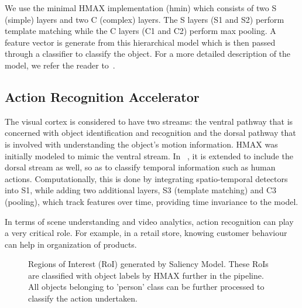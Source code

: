 We use the minimal HMAX implementation (hmin) which consists of two S (simple) layers and two C (complex) layers. The S layers (S1 and S2) perform template matching while the C layers (C1 and C2) perform max pooling. A feature vector is generate from this hierarchical model which is then passed through a classifier to classify the object. For a more detailed description of the model, we refer the reader to~\cite{Mutch2008}.

\subsection{Action Recognition Accelerator}
The visual cortex is considered to have two streams: the ventral pathway that is concerned with object identification and recognition and the dorsal pathway that is involved with understanding the object's motion information. HMAX was initially modeled to mimic the ventral stream. In ~\cite{action-recognition}, it is extended to include the dorsal stream as well, so as to classify temporal information such as human actions. Computationally, this is done by integrating spatio-temporal detectors into S1, while adding two additional layers, S3 (template matching) and C3 (pooling), which track features over time, providing time invariance to the model.

In terms of scene understanding and video analytics, action recognition can play a very critical role. For example, in a retail store, knowing customer behaviour can help in organization of products. 

\begin{figure}[ht!]
\centering
{}
\caption{\label{fig:RoIs_campus_000042} Regions of Interest (RoI) generated by Saliency Model. These RoIs are classified with object labels by HMAX further in the pipeline. All objects belonging to 'person' class can be further processed to classify the action undertaken.}
\end{figure}

